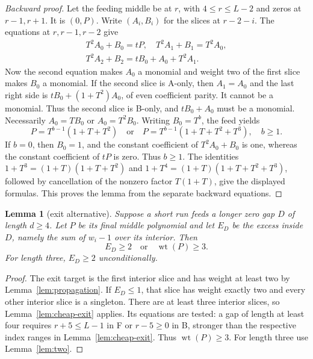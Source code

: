 \documentclass{article}
\newtheorem{lemma}{Lemma}
\DeclareMathOperator{\wt}{wt}
\begin{document}
\begin{proof}[Backward proof]
  Let the feeding middle be at \(r\), with \(4 \le r \le L-2\) and zeros at \(r - 1, r + 1\). It is
  \((0, P)\). Write \((A_i, B_i)\) for the slices at \(r - 2 - i\). The equations at
  \(r, r - 1, r - 2\) give
  \begin{equation}\label{eq:cheap-backward}
    \begin{gathered}
      T^2 A_0 + B_0 = tP, \quad T^2 A_1 + B_1 = T^2 A_0, \\
      T^2 A_2 + B_2 = t B_0 + A_0 + T^2 A_1.
    \end{gathered}
  \end{equation}
  Now the second equation makes \(A_0\) a monomial and weight two of the first slice makes \(B_0\)
  a monomial. If the second slice is A-only, then \(A_1 = A_0\) and the last right side is
  \(t B_0 + (1 + T^2)A_0\), of even coefficient parity. It cannot be a monomial. Thus the second
  slice is B-only, and \(t B_0 + A_0\) must be a monomial. Necessarily \(A_0 = T B_0\) or
  \(A_0 = T^2 B_0\). Writing \(B_0 = T^b\), the feed yields
  \begin{equation}
    P = T^{b-1}(1 + T + T^2) \quad \text{or} \quad
    P = T^{b-1}(1 + T + T^2 + T^3), \quad b \ge 1.
  \end{equation}
  If \(b=0\), then \(B_0=1\), and the constant coefficient of
  \(T^2A_0+B_0\) is one, whereas the constant coefficient of \(tP\) is zero.
  Thus \(b\ge1\). The identities
  \(1+T^3=(1+T)(1+T+T^2)\) and
  \(1+T^4=(1+T)(1+T+T^2+T^3)\), followed by cancellation of the nonzero
  factor \(T(1+T)\), give the displayed formulas. This proves the lemma from the separate backward
  equations.
\end{proof}

\begin{lemma}[exit alternative]\label{lem:exit-alternative}
  Suppose a short run feeds a longer zero gap \(D\) of length \(d \ge 4\). Let \(P\) be its final
  middle polynomial and let \(E_D\) be the excess inside \(D\), namely the sum of \(w_i - 1\) over
  its interior. Then
  \begin{equation}\label{eq:exit-alternative}
    E_D \ge 2 \quad \text{or} \quad \wt(P) \ge 3.
  \end{equation}
  For length three, \(E_D \ge 2\) unconditionally.
\end{lemma}

\begin{proof}
  The exit target is the first interior slice and has weight at least two by
  Lemma~\ref{lem:propagation}. If \(E_D \le 1\), that slice has weight exactly two and every other
  interior slice is a singleton. There are at least three interior slices, so
  Lemma~\ref{lem:cheap-exit} applies. Its equations are tested: a gap of length at least four
  requires \(r + 5 \le L-1\) in F or \(r - 5 \ge 0\) in B, stronger than the respective index
  ranges in Lemma~\ref{lem:cheap-exit}. Thus \(\wt(P) \ge 3\). For length three use
  Lemma~\ref{lem:two}.
\end{proof}
\end{document}
